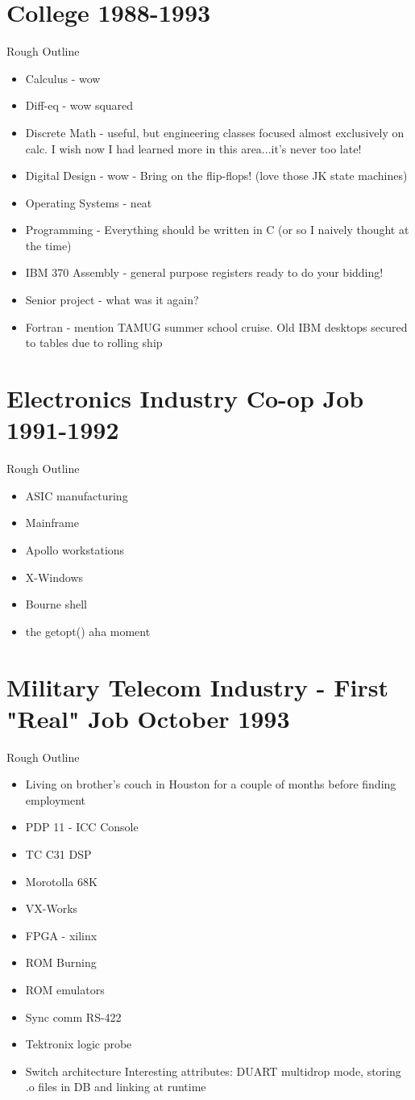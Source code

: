 \documentclass[12pt]{article}
\begin{document}
\section{College 1988-1993}
	Rough Outline
	\begin{itemize}
	\item Calculus - wow
	\item Diff-eq - wow squared
	\item Discrete Math - useful, but engineering classes focused almost exclusively on calc. I wish now I had 
	learned more in this area...it's never too late!
	\item Digital Design - wow - Bring on the flip-flops! (love those JK state machines)
	\item Operating Systems - neat
	\item Programming - Everything should be written in C (or so I naively thought at the time)
	\item IBM 370 Assembly - general purpose registers ready to do your bidding!
	\item Senior project - what was it again?
	\item Fortran - mention TAMUG summer school cruise. Old IBM desktops secured to tables due to rolling ship
	\end{itemize}

\section{Electronics Industry Co-op Job 1991-1992}
	Rough Outline
	\begin{itemize}
	\item ASIC manufacturing
	\item Mainframe
	\item Apollo workstations
	\item X-Windows
	\item Bourne shell
	\item the getopt() aha moment
	\end{itemize}
	
\section{Military Telecom Industry - First "Real" Job October 1993}
	Rough Outline
	\begin{itemize}
	\item Living on brother's couch in Houston for a couple of months before finding employment
	\item PDP 11 - ICC Console
	\item TC C31 DSP
	\item Morotolla 68K
	\item VX-Works
	\item FPGA - xilinx
	\item ROM Burning
	\item ROM emulators
	\item Sync comm RS-422
	\item Tektronix logic probe
	\item Switch architecture Interesting attributes: DUART multidrop mode, storing .o files in DB and linking at runtime
	\end{itemize}
\end{document}
